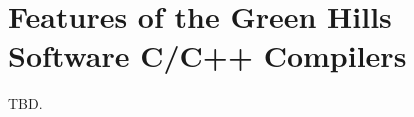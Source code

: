 \section{Features of the Green Hills Software\textsuperscript{\textregistered}
         C/C++ Compilers}
\label{sghc0}

TBD.

